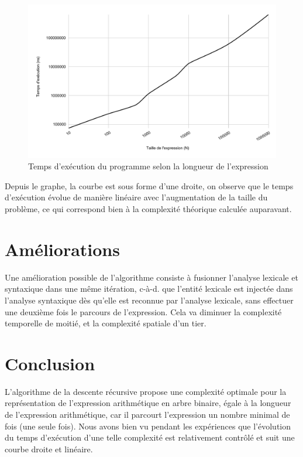 \begin{figure}[H]
    \centering
        \includegraphics[scale=0.5]{./ressources/temps_execution_algo2.pdf}
        \caption{Temps d'exécution du programme selon la longueur de l'expression}
    \label{fig:temps_exec_algo2}
\end{figure}
\par
Depuis le graphe, la courbe est sous forme d'une droite, on observe que le temps d'exécution évolue de manière linéaire avec l'augmentation de la taille du problème, ce qui correspond bien à la complexité théorique calculée auparavant. 

\section{Améliorations}
Une amélioration possible de l'algorithme consiste à fusionner l'analyse lexicale et syntaxique dans une même itération, c-à-d. que l'entité lexicale est injectée dans l'analyse syntaxique dès qu'elle est reconnue par l'analyse lexicale, sans effectuer une deuxième fois le parcours de l'expression. Cela va diminuer la complexité temporelle de moitié, et la complexité spatiale d'un tier.

\section{Conclusion}
L'algorithme de la descente récursive propose une complexité optimale pour la représentation de l'expression arithmétique en arbre binaire, égale à la longueur de l'expression arithmétique, car il parcourt l'expression un nombre minimal de fois (une seule fois). Nous avons bien vu pendant les expériences que l'évolution du temps d'exécution d'une telle complexité est relativement contrôlé et suit une courbe droite et linéaire.

